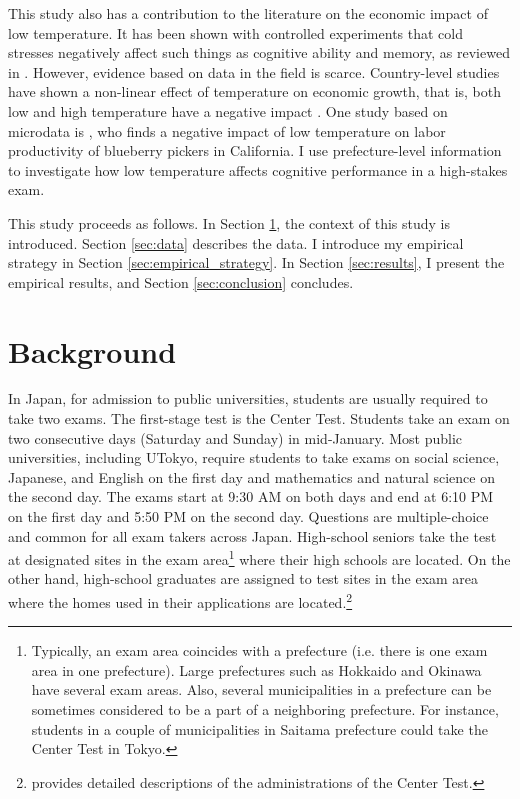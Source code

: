 \documentclass[12pt,letterpaper]{article}
\begin{document}
This study also has a contribution to the literature on the economic impact of low temperature.
It has been shown with controlled experiments that cold stresses negatively affect such things as cognitive ability and memory, as reviewed in \citet{Taylor2016}.
However, evidence based on data in the field is scarce.
Country-level studies have shown a non-linear effect of temperature on economic growth, that is, both low and high temperature have a negative impact \citep{Burke2015}.
One study based on microdata is \citet{Stevens2017}, who finds a negative impact of low temperature on labor productivity of blueberry pickers in California.
I use prefecture-level information to investigate how low temperature affects cognitive performance in a high-stakes exam.

This study proceeds as follows.
In Section \ref{sec:background}, the context of this study is introduced.
Section \ref{sec:data} describes the data. 
I introduce my empirical strategy in Section \ref{sec:empirical_strategy}.
In Section \ref{sec:results}, I present the empirical results, and Section \ref{sec:conclusion} concludes.
  
\section{Background}\label{sec:background}

In Japan, for admission to public universities, students are usually required to take two exams.
The first-stage test is the Center Test.
Students take an exam on two consecutive days (Saturday and Sunday) in mid-January.
Most public universities, including UTokyo, require students to take exams on social science, Japanese, and English on the first day and mathematics and natural science on the second day.
The exams start at 9:30 AM on both days and end at 6:10 PM on the first day and 5:50 PM on the second day.
Questions are multiple-choice and common for all exam takers across Japan.
High-school seniors take the test at designated sites in the exam area\footnote{ \label{footnote:prefecture}
  Typically, an exam area coincides with a prefecture (i.e. there is one exam area in one prefecture).
  Large prefectures such as Hokkaido and Okinawa have several exam areas.
  Also, several municipalities in a prefecture can be sometimes considered to be a part of a neighboring prefecture.
  For instance, students in a couple of municipalities in Saitama prefecture could take the Center Test in Tokyo.
} where their high schools are located.
On the other hand, high-school graduates are assigned to test sites in the exam area where the homes used in their applications are located.\footnote{
  \citet{Watanabe2013} provides detailed descriptions of the administrations of the Center Test.
}
\end{document}
